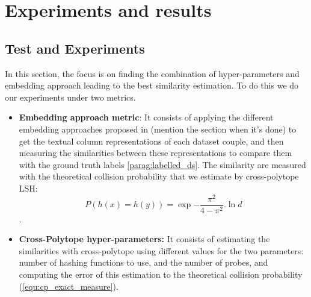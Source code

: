 \chapter{Experiments and results}
\label{chap:exp_and_tests}
\section{Test and Experiments}
In this section, the focus is on finding the combination of hyper-parameters and
embedding approach leading to the best similarity estimation. To do this we
do our experiments under two metrics.
\begin{itemize}
    \item \textbf{Embedding approach metric}: It consists of applying the
          different embedding approaches proposed in (mention the section when
          it's done) to get the textual column representations of each dataset
          couple, and then measuring the similarities between these
          representations to compare them with the ground truth labels
          \ref{parag:labelled_ds}. The similarity are measured with the
          theoretical collision probability that we estimate by cross-polytope
          LSH:
          \begin{equation}
              \label{equ:cp_exact_measure}
              P(h(x) = h(y)) = \exp{- \frac{\pi ^2}{4 - \pi ^2}. \ln{d}}
          \end{equation}.
    \item \textbf{Cross-Polytope hyper-parameters:} It consists of estimating
          the similarities with cross-polytope using different values for the
          two parameters: number of hashing functions to use, and the number of
          probes, and computing the error of this estimation to the theoretical
          collision probability (\ref{equ:cp_exact_measure}).
\end{itemize}

